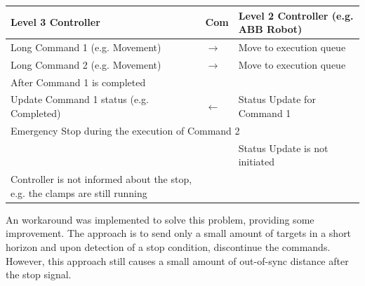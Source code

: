 \documentclass[11pt]{book}
\begin{document}
\begin{table}[H]
\begin{adjustbox}{max width=\textwidth}
\begin{tabular}{p{7.04cm}p{1.67cm}p{7.17cm}}
\hline
\multicolumn{1}{|p{7.04cm}}{{\footnotesize \textbf{Level 3 Controller}}} & 
\multicolumn{1}{|p{1.67cm}}{{\footnotesize \textbf{Com}}} & 
\multicolumn{1}{|p{7.17cm}|}{{\footnotesize \textbf{Level 2 Controller (e.g. ABB Robot)}}} \\ 
\hline
\multicolumn{1}{|p{7.04cm}}{{\footnotesize Long Command 1 (e.g. Movement)}} & 
\multicolumn{1}{|p{1.67cm}}{\centering
{\footnotesize $\rightarrow$}} & 
\multicolumn{1}{|p{7.17cm}|}{{\footnotesize Move to execution queue}} \\ 
\hline
\multicolumn{1}{|p{7.04cm}}{{\footnotesize Long Command 2 (e.g. Movement)}} & 
\multicolumn{1}{|p{1.67cm}}{\centering
{\footnotesize $\rightarrow$}} & 
\multicolumn{1}{|p{7.17cm}|}{{\footnotesize Move to execution queue}} \\ 
\hline
\multicolumn{3}{|p{15.87cm}|}{{\footnotesize After Command 1 is completed}} \\ 
\hline
\multicolumn{1}{|p{7.04cm}}{{\footnotesize Update Command 1 status (e.g. Completed)}} & 
\multicolumn{1}{|p{1.67cm}}{\centering
{\footnotesize $\leftarrow$}} & 
\multicolumn{1}{|p{7.17cm}|}{{\footnotesize Status Update for Command 1}} \\ 
\hline
\multicolumn{3}{|p{15.87cm}|}{{\footnotesize Emergency Stop during the execution of Command 2}} \\ 
\hline
\multicolumn{1}{|p{7.04cm}}{} & 
\multicolumn{1}{|p{1.67cm}}{} & 
\multicolumn{1}{|p{7.17cm}|}{{\footnotesize Status Update is not initiated}} \\ 
\hline
\multicolumn{1}{|p{7.04cm}}{{\footnotesize Controller is not informed about the stop, e.g. the clamps are still running}} & 
\multicolumn{1}{|p{1.67cm}}{} & 
\multicolumn{1}{|p{7.17cm}|}{} \\ 
\hline
\end{tabular}
\end{adjustbox}
\end{table}
\vspace{4\baselineskip}
An workaround was implemented to solve this problem, providing some improvement. The approach is to send only a small amount of targets in a short horizon and upon detection of a stop condition, discontinue the commands. However, this approach still causes a small amount of out-of-sync distance after the stop signal. 
\end{document}
